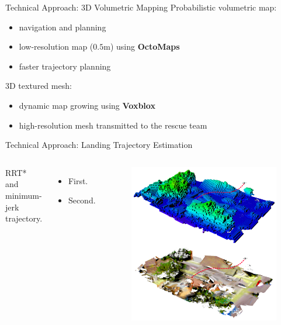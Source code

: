 \documentclass[10pt]{beamer}
\begin{document}
    \begin{frame}{Technical Approach: 3D Volumetric Mapping}
        Probabilistic volumetric map:
        \begin{itemize}
            \item navigation and planning
            \item low-resolution map ($0.5$m) using \textbf{OctoMaps}
            \item faster trajectory planning
        \end{itemize}

        3D textured mesh:
        \begin{itemize}
            \item dynamic map growing using \textbf{Voxblox}
            \item high-resolution mesh transmitted to the rescue team
        \end{itemize}
    \end{frame}

    \begin{frame}{Technical Approach: Landing Trajectory Estimation}
        \begin{columns}[c,onlytextwidth]
                RRT* and minimum-jerk trajectory.
                \begin{itemize}
                    \item First.
                    \item Second.
                \end{itemize}

                \begin{figure}
                    \includegraphics[width=\textwidth]{images/Fig4.png}
                \end{figure}
        \end{columns}
    \end{frame}
\end{document}
